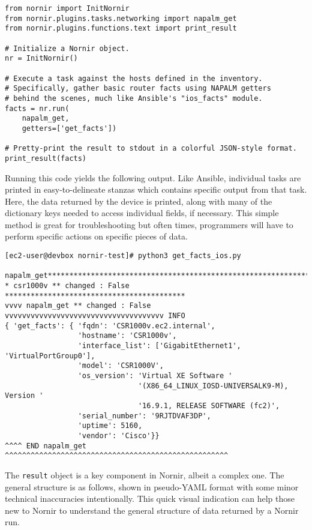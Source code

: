 \begin{verbatim}
from nornir import InitNornir
from nornir.plugins.tasks.networking import napalm_get
from nornir.plugins.functions.text import print_result

# Initialize a Nornir object.
nr = InitNornir()

# Execute a task against the hosts defined in the inventory.
# Specifically, gather basic router facts using NAPALM getters
# behind the scenes, much like Ansible's "ios_facts" module.
facts = nr.run(
    napalm_get,
    getters=['get_facts'])

# Pretty-print the result to stdout in a colorful JSON-style format.
print_result(facts)
\end{verbatim}

Running this code yields the following output. Like Ansible, individual tasks
are printed in easy-to-delineate stanzas which contains specific output from
that task. Here, the data returned by the device is printed, along with many
of the dictionary keys needed to access individual fields, if necessary. This
simple method is great for troubleshooting but often times, programmers will
have to perform specific actions on specific pieces of data.

\begin{verbatim}
[ec2-user@devbox nornir-test]# python3 get_facts_ios.py 

napalm_get**************************************************************
* csr1000v ** changed : False ******************************************
vvvv napalm_get ** changed : False vvvvvvvvvvvvvvvvvvvvvvvvvvvvvvvvvvvvv INFO
{ 'get_facts': { 'fqdn': 'CSR1000v.ec2.internal',
                 'hostname': 'CSR1000v',
                 'interface_list': ['GigabitEthernet1', 'VirtualPortGroup0'],
                 'model': 'CSR1000V',
                 'os_version': 'Virtual XE Software '
                               '(X86_64_LINUX_IOSD-UNIVERSALK9-M), Version '
                               '16.9.1, RELEASE SOFTWARE (fc2)',
                 'serial_number': '9RJTDVAF3DP',
                 'uptime': 5160,
                 'vendor': 'Cisco'}}
^^^^ END napalm_get ^^^^^^^^^^^^^^^^^^^^^^^^^^^^^^^^^^^^^^^^^^^^^^^^^^^^
\end{verbatim}

The \verb|result| object is a key component in Nornir, albeit a complex one.
The general structure is as follows, shown in pseudo-YAML format with some
minor technical inaccuracies intentionally. This quick visual indication can
help those new to Nornir to understand the general structure of data returned
by a Nornir run.

